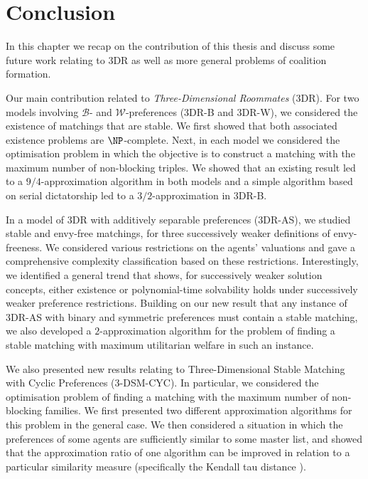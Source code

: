 \chapter{Conclusion}
\label{c:conclusion}

In this chapter we recap on the contribution of this thesis and discuss some future work relating to 3DR as well as more general problems of coalition formation.


Our main contribution related to \emph{Three-Dimensional Roommates} (3DR). For two models involving $\mathscr{B}$- and $\mathscr{W}$-preferences (3DR-B and 3DR-W), we considered the existence of matchings that are stable. We first showed that both associated existence problems are $\NP$-complete. Next, in each model we considered the optimisation problem in which the objective is to construct a matching with the maximum number of non-blocking triples. We showed that an existing result led to a $9/4$-approximation algorithm in both models and a simple algorithm based on serial dictatorship led to a $3/2$-approximation in 3DR-B.

In a model of 3DR with additively separable preferences (3DR-AS), we studied stable and envy-free matchings, for three successively weaker definitions of envy-freeness. We considered various restrictions on the agents' valuations and gave a comprehensive complexity classification based on these restrictions. Interestingly, we identified a general trend that shows, for successively weaker solution concepts, either existence or polynomial-time solvability holds under successively weaker preference restrictions. Building on our new result that any instance of 3DR-AS with binary and symmetric preferences must contain a stable matching, we also developed a $2$-approximation algorithm for the problem of finding a stable matching with maximum utilitarian welfare in such an instance.

We also presented new results relating to Three-Dimensional Stable Matching with Cyclic Preferences (3-DSM-CYC). In particular, we considered the optimisation problem of finding a matching with the maximum number of non-blocking families. We first presented two different approximation algorithms for this problem in the general case. We then considered a situation in which the preferences of some agents are sufficiently similar to some master list, and showed that the approximation ratio of one algorithm can be improved in relation to a particular similarity measure (specifically the Kendall tau distance \cite{KendallTauCitation}).

